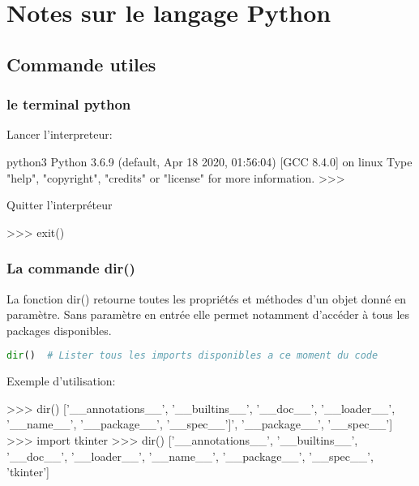 \section{Notes sur le langage Python}

\subsection{Commande utiles}

\subsubsection{le terminal python}

Lancer l'interpreteur:

\begin{terminal}
python3
Python 3.6.9 (default, Apr 18 2020, 01:56:04) 
[GCC 8.4.0] on linux
Type "help", "copyright", "credits" or "license" for more information.
>>> 
\end{terminal}

Quitter l'interpréteur

\begin{terminal}
>>> exit()
\end{terminal}

\subsubsection{La commande dir()}

La fonction dir() retourne toutes les propriétés et méthodes d'un objet donné en paramètre. Sans paramètre en entrée elle permet notamment d'accéder à tous les packages disponibles.

\begin{lstlisting}[language=Python]
dir()  # Lister tous les imports disponibles a ce moment du code
\end{lstlisting}

Exemple d'utilisation:

\begin{terminal}
>>> dir()
['__annotations__', '__builtins__', '__doc__', '__loader__', '__name__', '__package__', '__spec__']', '__package__', '__spec__']
>>> import tkinter
>>> dir()
['__annotations__', '__builtins__', '__doc__', '__loader__', '__name__', '__package__', '__spec__', 'tkinter']
\end{terminal}


